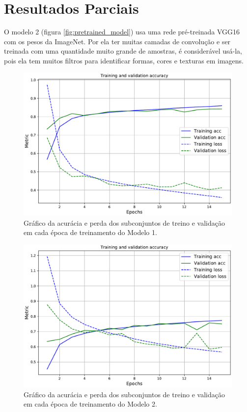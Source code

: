 \section*{Resultados Parciais}
O modelo 2 (figura \ref{fig:pretrained_model}) usa uma rede pré-treinada VGG16 com os pesos da ImageNet. Por ela ter muitas camadas de convolução e ser treinada com uma quantidade muito grande de amostras, é considerável usá-la, pois ela tem muitos filtros para identificar formas, cores e texturas em imagens.

\pagebreak
\begin{figure}[h!]
  \centering
  \includegraphics[width=.78\textwidth]{figures/conv_train.pdf}
  \caption{Gráfico da acurácia e perda dos subconjuntos de treino e validação em cada época de treinamento do Modelo 1.}
  \label{fig:conv_train}
\end{figure}

\begin{figure}[h!]
  \centering
  \includegraphics[width=.78\textwidth]{figures/pretrained_train.pdf}
  \caption{Gráfico da acurácia e perda dos subconjuntos de treino e validação em cada época de treinamento do Modelo 2.}
  \label{fig:pretrained_train}
\end{figure}
